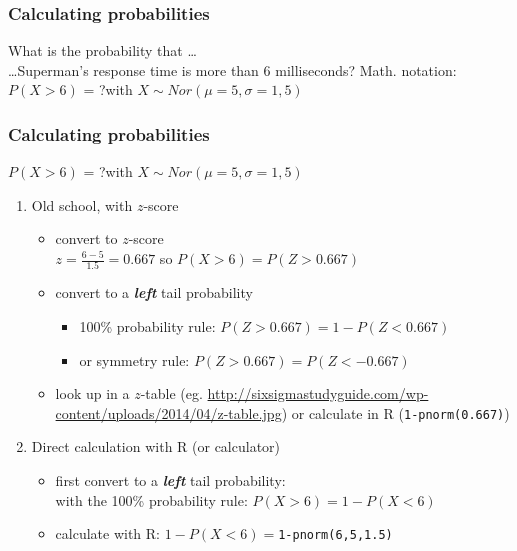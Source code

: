 \documentclass{beamer}
\begin{document}
\begin{frame}
\frametitle{Calculating probabilities}
What is the probability that \dots\\
\ldots Superman's response time is more than 6 milliseconds?
\vfill
Math. notation:\\
\hspace{1cm}$P( X > 6)$ = ?\hspace{1cm}with $X \sim Nor(\mu=5,\sigma=1,5)$
\vfill
{}
\end{frame}

\begin{frame}
  \frametitle{Calculating probabilities}
  $P( X > 6)$ = ?\hspace{1cm}with $X \sim Nor(\mu=5,\sigma=1,5)$
  \vfill
  \begin{enumerate}
  \item Old school, with $z$-score
    \begin{itemize}
      \pause
      \item convert to $z$-score\\
      $z=\frac{6-5}{1.5}=0.667$ so $P(X>6) = P(Z>0.667)$
      \item convert to a \textbf{\textit{left}} tail probability
      \begin{itemize}
          \item 100\% probability rule: $P(Z>0.667)=1-P(Z<0.667)$
          \item or symmetry rule: $P(Z>0.667)=P(Z<-0.667)$
      \end{itemize}
      \item look up in a $z$-table
      (eg. \url{http://sixsigmastudyguide.com/wp-content/uploads/2014/04/z-table.jpg})
      or calculate in R (\texttt{1-pnorm(0.667)})
  \end{itemize}
  \vfill
  \item Direct calculation with R (or calculator)
  \begin{itemize}
      \pause
      \item first convert to a \textbf{\textit{left}} tail probability:\\
      with the 100\% probability rule: $P(X>6)=1-P(X<6)$
      \item calculate with R: $1-P(X<6)=$\texttt{1-pnorm(6,5,1.5)}
  \end{itemize}
  \end{enumerate}
\end{frame}
\end{document}
